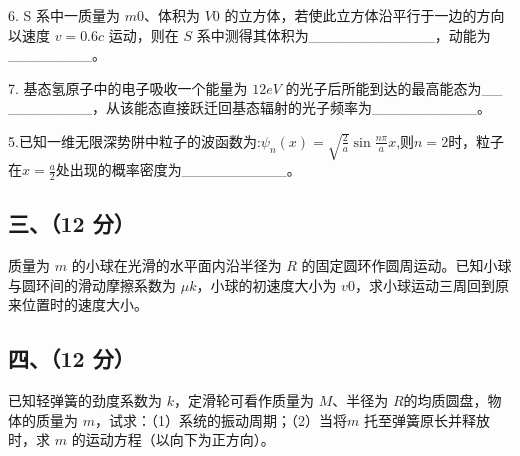 6. S 系中一质量为 $m0$、体积为 $V0$ 的立方体，若使此立方体沿平行于一边的方向以速度 $v=0.6c$ 运动，则在 $S$ 系中测得其体积为____________，动能为________。

7. 基态氢原子中的电子吸收一个能量为 $12eV$ 的光子后所能到达的最高能态为__
________，从该能态直接跃迁回基态辐射的光子频率为__________。

5.已知一维无限深势阱中粒子的波函数为:$\psi_n(x)=\sqrt{\frac{2}{a}}\sin\frac{n\pi}{a}x$,则$n=2$时，粒子在$x=\frac{a}{2}$处出现的概率密度为__________。
\subsection{三、（12 分）}
质量为 $m$ 的小球在光滑的水平面内沿半径为 $R$ 的固定圆环作圆周运动。已知小球与圆环间的滑动摩擦系数为 $\mu k$，小球的初速度大小为 $v0$，求小球运动三周回到原来位置时的速度大小。
\subsection{四、（12 分）}
已知轻弹簧的劲度系数为 $k$，定滑轮可看作质量为 $M$、半径为 $R$的均质圆盘，物体的质量为 $m$，试求：（1）系统的振动周期；（2）当将$m$ 托至弹簧原长并释放时，求 $m$ 的运动方程（以向下为正方向）。